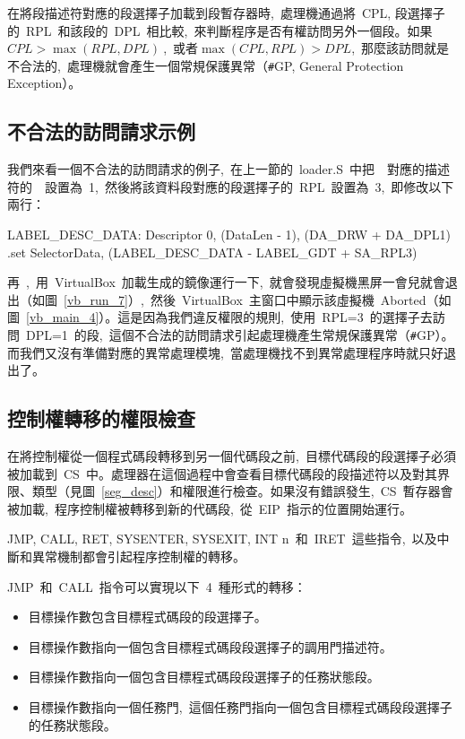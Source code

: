 在將段描述符對應的段選擇子加載到段暫存器時,~處理機通過將~CPL, 段選擇子的~RPL~和該段的~DPL~相比較,~來判斷程序是否有權訪問另外一個段。如果~$CPL>\max{(RPL, DPL)}~$,~或者$\max{(CPL, RPL)}>DPL$,~那麼該訪問就是不合法的,~處理機就會產生一個常規保護異常（\texttt{\#}GP, General Protection Exception）。

\subsection{不合法的訪問請求示例}

我們來看一個不合法的訪問請求的例子,~在上一節的~loader.S~中把~~對應的描述符的~~設置為~1,~然後將該資料段對應的段選擇子的~RPL~設置為~3,~即修改以下兩行：
\begin{Command}
LABEL_DESC_DATA:    Descriptor        0,      (DataLen - 1), (DA_DRW + DA_DPL1)
.set    SelectorData,   (LABEL_DESC_DATA   - LABEL_GDT + SA_RPL3)
\end{Command}



再~,~用~VirtualBox~加載生成的鏡像運行一下,~就會發現虛擬機黑屏一會兒就會退出（如圖~\ref{vb_run_7}）,~然後~VirtualBox~主窗口中顯示該虛擬機~Aborted（如圖~\ref{vb_main_4}）。這是因為我們違反權限的規則,~使用~RPL=3~的選擇子去訪問~DPL=1~的段,~這個不合法的訪問請求引起處理機產生常規保護異常（\texttt{\#}GP）。而我們又沒有準備對應的異常處理模塊,~當處理機找不到異常處理程序時就只好退出了。


\subsection{控制權轉移的權限檢查}

在將控制權從一個程式碼段轉移到另一個代碼段之前,~目標代碼段的段選擇子必須被加載到~CS~中。處理器在這個過程中會查看目標代碼段的段描述符以及對其界限、類型（見圖~\ref{seg_desc}）和權限進行檢查。如果沒有錯誤發生,~CS~暫存器會被加載,~程序控制權被轉移到新的代碼段,~從~EIP~指示的位置開始運行。

JMP, CALL, RET, SYSENTER, SYSEXIT, INT n~和~IRET~這些指令,~以及中斷和異常機制都會引起程序控制權的轉移。

JMP~和~CALL~指令可以實現以下~4~種形式的轉移：

\begin{itemize}
\item 目標操作數包含目標程式碼段的段選擇子。
\item 目標操作數指向一個包含目標程式碼段段選擇子的調用門描述符。
\item 目標操作數指向一個包含目標程式碼段段選擇子的任務狀態段。
\item 目標操作數指向一個任務門,~這個任務門指向一個包含目標程式碼段段選擇子的任務狀態段。
\end{itemize}

